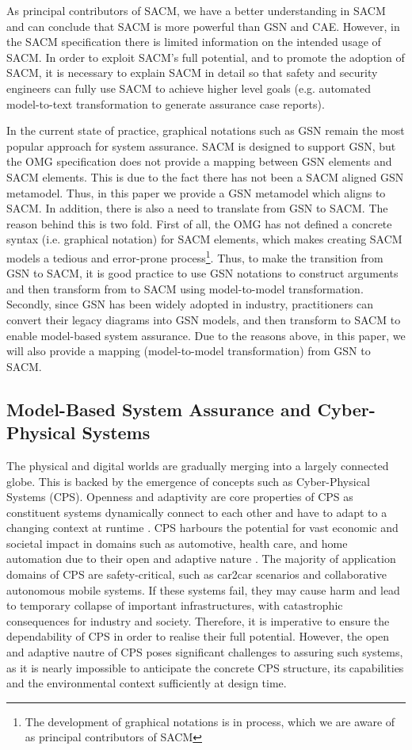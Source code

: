 As principal contributors of SACM, we have a better understanding in SACM and can conclude that SACM is more powerful than GSN and CAE.
However, in the SACM specification there is limited information on the intended usage of SACM. 
In order to exploit SACM's full potential, and to promote the adoption of SACM, it is necessary to explain SACM in detail so that safety and security engineers can fully use SACM to achieve higher level goals (e.g. automated model-to-text transformation to generate assurance case reports). 

In the current state of practice, graphical notations such as GSN remain the most popular approach for system assurance. 
SACM is designed to support GSN, but the OMG specification does not provide a mapping between GSN elements and SACM elements. 
This is due to the fact there has not been a SACM aligned GSN metamodel. 
Thus, in this paper we provide a GSN metamodel which aligns to SACM. 
In addition, there is also a need to translate from GSN to SACM. 
The reason behind this is two fold. First of all, the OMG has not defined a concrete syntax (i.e. graphical notation) for SACM elements, which makes creating SACM models a tedious and error-prone process\footnote{The development of graphical notations is in process, which we are aware of as principal contributors of SACM}. 
Thus, to make the transition from GSN to SACM, it is good practice to use GSN notations to construct arguments and then transform from to SACM using model-to-model transformation. Secondly, since GSN has been widely adopted in industry, practitioners can convert their legacy diagrams into GSN models, and then transform to SACM to enable model-based system assurance. 
Due to the reasons above, in this paper, we will also provide a mapping (model-to-model transformation) from GSN to SACM.

\subsection{Model-Based System Assurance and Cyber-Physical Systems}
The physical and digital worlds are gradually merging into a largely connected globe. 
This is backed by the emergence of concepts such as Cyber-Physical Systems (CPS).
Openness and adaptivity are core properties of CPS as constituent systems dynamically connect to each other and have to adapt to a changing context at runtime \cite{trapp2013safety}.
CPS harbours the potential for vast economic and societal impact in domains such as automotive, health care, and home automation due to their open and adaptive nature \cite{wei2017deis}.
The majority of application domains of CPS are safety-critical, such as car2car scenarios and collaborative autonomous mobile systems.
If these systems fail, they may cause harm and lead to temporary collapse of important infrastructures, with catastrophic consequences for industry and society.
Therefore, it is imperative to ensure the dependability of CPS in order to realise their full potential. 
However, the open and adaptive nautre of CPS poses significant challenges to assuring such systems, as it is nearly impossible to anticipate the concrete CPS structure, its capabilities and the environmental context sufficiently at design time.

